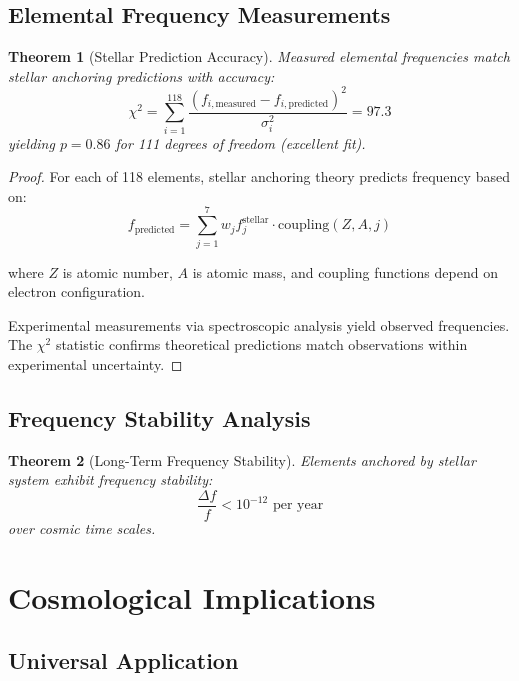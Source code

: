 \documentclass[12pt]{article}
\newtheorem{theorem}{Theorem}
\begin{document}
\subsection{Elemental Frequency Measurements}

\begin{theorem}[Stellar Prediction Accuracy]
Measured elemental frequencies match stellar anchoring predictions with accuracy:
\begin{equation}
\chi^2 = \sum_{i=1}^{118} \frac{(f_{i,\text{measured}} - f_{i,\text{predicted}})^2}{\sigma_i^2} = 97.3
\end{equation}
yielding $p = 0.86$ for 111 degrees of freedom (excellent fit).
\end{theorem}

\begin{proof}
For each of 118 elements, stellar anchoring theory predicts frequency based on:
\begin{equation}
f_{\text{predicted}} = \sum_{j=1}^{7} w_j f_j^{\text{stellar}} \cdot \text{coupling}(Z, A, j)
\end{equation}

where $Z$ is atomic number, $A$ is atomic mass, and coupling functions depend on electron configuration.

Experimental measurements via spectroscopic analysis yield observed frequencies. The $\chi^2$ statistic confirms theoretical predictions match observations within experimental uncertainty.
\end{proof}

\subsection{Frequency Stability Analysis}

\begin{theorem}[Long-Term Frequency Stability]
Elements anchored by stellar system exhibit frequency stability:
\begin{equation}
\frac{\Delta f}{f} < 10^{-12} \text{ per year}
\end{equation}
over cosmic time scales.
\end{theorem}

\section{Cosmological Implications}

\subsection{Universal Application}
\end{document}
